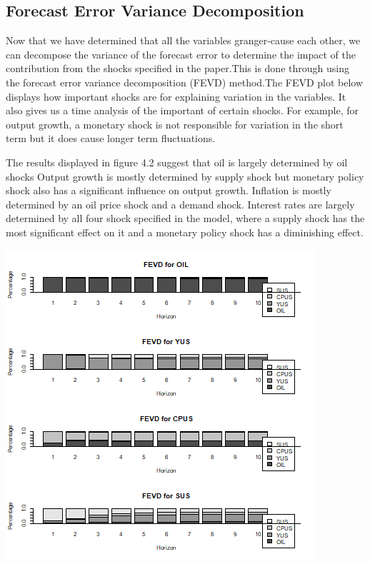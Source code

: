 \documentclass[11pt,preprint, authoryear]{elsarticle}
\let\origfigure\figure
\let\endorigfigure\endfigure
\renewenvironment{figure}[1][2] {
    \expandafter\origfigure\expandafter[H]
} {
    \endorigfigure
}
\numberwithin{equation}{section}
\numberwithin{figure}{section}
\numberwithin{table}{section}
\begin{document}
\hypertarget{forecast-error-variance-decomposition}{%
\subsection{Forecast Error Variance
Decomposition}\label{forecast-error-variance-decomposition}}

Now that we have determined that all the variables granger-cause each
other, we can decompose the variance of the forecast error to determine
the impact of the contribution from the shocks specified in the
paper.This is done through using the forecast error variance
decomposition (FEVD) method.The FEVD plot below displays how important
shocks are for explaining variation in the variables. It also gives us a
time analysis of the important of certain shocks. For example, for
output growth, a monetary shock is not responsible for variation in the
short term but it does cause longer term fluctuations.

The results displayed in figure 4.2 suggest that oil is largely
determined by oil shocks Output growth is mostly determined by supply
shock but monetary policy shock also has a significant influence on
output growth. Inflation is mostly determined by an oil price shock and
a demand shock. Interest rates are largely determined by all four shock
specified in the model, where a supply shock has the most significant
effect on it and a monetary policy shock has a diminishing effect.

\begin{figure}[H]

{\centering \includegraphics{replication_files/figure-latex/r Figure9-1} 

}

\caption{Forcast error variance decomposition\label{Figure9}}\label{fig:r Figure9}
\end{figure}
\end{document}
